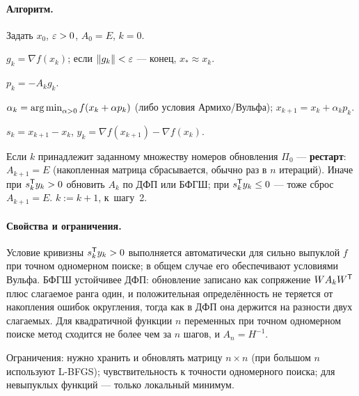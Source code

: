 \paragraph{Алгоритм.}
\begin{csteps}
  \item Задать $x_0$, $\varepsilon > 0$, $A_0 = E$, $k = 0$.
  \item $g_k = \nabla f(x_k)$; если $\left\lVert g_k \right\rVert < \varepsilon$ — конец,
        $x_* \approx x_k$.
  \item $p_k = -A_k g_k$.
  \item $\alpha_k = \operatorname*{arg\,min}_{\alpha>0} f(x_k + \alpha p_k)$ (либо условия
        Армихо/Вульфа); $x_{k+1} = x_k + \alpha_k p_k$.
  \item $s_k = x_{k+1} - x_k$, $y_k = \nabla f(x_{k+1}) - \nabla f(x_k)$.
  \item Если $k$ принадлежит заданному множеству номеров обновления $\Pi_0$ —
        \textbf{рестарт}: $A_{k+1} = E$ (накопленная матрица сбрасывается,
        обычно раз в $n$ итераций). Иначе при $s_k^{\mathsf{T}} y_k > 0$ обновить $A_k$
        по ДФП или БФГШ; при $s_k^{\mathsf{T}} y_k \le 0$ — тоже сброс $A_{k+1} = E$.
        $k := k+1$, к~шагу~2.
\end{csteps}

\paragraph{Свойства и ограничения.}
Условие кривизны $s_k^{\mathsf{T}} y_k > 0$ выполняется автоматически для сильно выпуклой
$f$ при точном одномерном поиске; в общем случае его обеспечивают условиями
Вульфа. БФГШ устойчивее ДФП: обновление записано как сопряжение
$W A_k W^{\mathsf{T}}$ плюс слагаемое ранга один, и положительная определённость не
теряется от накопления ошибок округления, тогда как в ДФП она держится на
разности двух слагаемых. Для квадратичной функции $n$ переменных при точном
одномерном поиске метод сходится не более чем за $n$ шагов, и $A_n = H^{-1}$.

Ограничения: нужно хранить и обновлять матрицу $n \times n$ (при большом $n$
используют L-BFGS); чувствительность к точности одномерного поиска; для
невыпуклых функций — только локальный минимум.

